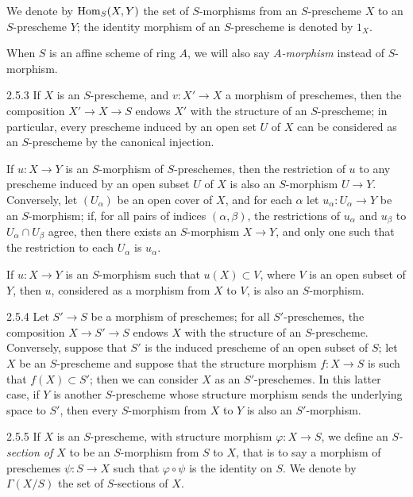 \documentclass[../main.tex]{subfiles}
\begin{document}
We denote by $\operatorname*{Hom}_S(X,Y)$ the set of $S$-morphisms from an $S$-prescheme $X$ to an $S$-prescheme $Y$; the identity morphism of an $S$-prescheme is denoted by $1_X$.

When $S$ is an affine scheme of ring $A$, we will also say \emph{$A$-morphism} instead of $S$-morphism.

\begin{cx}{2.5.3}
    If $X$ is an $S$-prescheme, and $v\colon X'\to X$ a morphism of preschemes, then the composition $X'\to X\to S$ endows $X'$ with the structure of an $S$-prescheme; in particular, every prescheme induced by an open set $U$ of $X$ can be considered as an $S$-prescheme by the canonical injection.
\end{cx}

If $u\colon X\to Y$ is an $S$-morphism of $S$-preschemes, then the restriction of $u$ to any prescheme induced by an open subset $U$ of $X$ is also an $S$-morphism $U\to Y$.
Conversely, let $(U_\alpha)$ be an open cover of $X$, and for each $\alpha$ let $u_\alpha\colon U_\alpha\to Y$ be an $S$-morphism; if, for all pairs of indices $(\alpha,\beta)$, the restrictions of $u_\alpha$ and $u_\beta$ to $U_\alpha\cap U_\beta$ agree, then there exists an $S$-morphism $X\to Y$, and only one such that the restriction to each $U_\alpha$ is $u_\alpha$.

If $u\colon X\to Y$ is an $S$-morphism such that $u(X)\subset V$, where $V$ is an open subset of $Y$, then $u$, considered as a morphism from $X$ to $V$, is also an $S$-morphism.

\begin{cx}{2.5.4}
    Let $S'\to S$ be a morphism of preschemes; for all $S'$-preschemes, the composition $X\to S'\to S$ endows $X$ with the structure of an $S$-prescheme.
    Conversely, suppose that $S'$ is the induced prescheme of an open subset of $S$; let $X$ be an $S$-prescheme and suppose that the structure morphism $f\colon X\to S$ is such that $f(X)\subset S'$; then we can consider $X$ as an $S'$-preschemes.
    In this latter case, if $Y$ is another $S$-prescheme whose structure morphism sends the underlying space to $S'$, then every $S$-morphism from $X$ to $Y$ is also an $S'$-morphism.
\end{cx}

\begin{cx}{2.5.5}
    If $X$ is an $S$-prescheme, with structure morphism $\varphi\colon X\to S$, we define an \emph{$S$-section of $X$} to be an $S$-morphism from $S$ to $X$, that is to say a morphism of preschemes $\psi\colon S\to X$ such that $\varphi\circ\psi$ is the identity on $S$.
    We denote by $\Gamma(X/S)$ the set of $S$-sections of $X$.
\end{cx}
\end{document}
